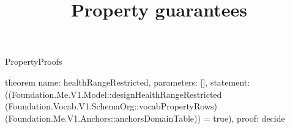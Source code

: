 \begin{lexlean}{PropertyProofs}
\title{Property guarantees}
\begin{semanticmodule}
theorem{
  name: healthRangeRestricted,
  parameters: [],
  statement: ((Foundation.Me.V1.Model::designHealthRangeRestricted (Foundation.Vocab.V1.SchemaOrg::vocabPropertyRows) (Foundation.Me.V1.Anchors::anchorsDomainTable)) = true),
  proof: decide{}
}
\end{semanticmodule}
\end{lexlean}
